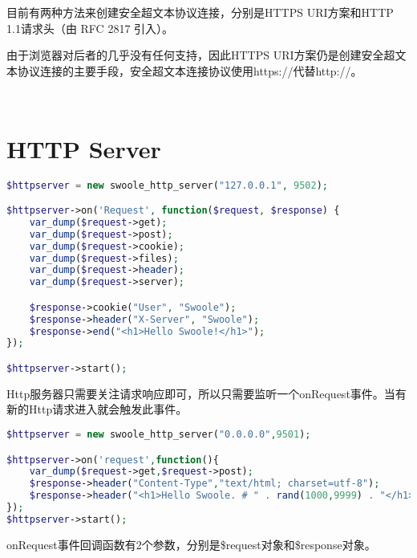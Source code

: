 目前有两种方法来创建安全超文本协议连接，分别是HTTPS URI方案和HTTP 1.1请求头（由 RFC 2817 引入）。

由于浏览器对后者的几乎没有任何支持，因此HTTPS URI方案仍是创建安全超文本协议连接的主要手段，安全超文本连接协议使用https://代替http://。




\begin{lstlisting}[language=PHP]

\end{lstlisting}




\begin{lstlisting}[language=PHP]

\end{lstlisting}


\section{HTTP Server}


\begin{lstlisting}[language=PHP]
$httpserver = new swoole_http_server("127.0.0.1", 9502);

$httpserver->on('Request', function($request, $response) {
    var_dump($request->get);
    var_dump($request->post);
    var_dump($request->cookie);
    var_dump($request->files);
    var_dump($request->header);
    var_dump($request->server);

    $response->cookie("User", "Swoole");
    $response->header("X-Server", "Swoole");
    $response->end("<h1>Hello Swoole!</h1>");
});

$httpserver->start();
\end{lstlisting}

Http服务器只需要关注请求响应即可，所以只需要监听一个onRequest事件。当有新的Http请求进入就会触发此事件。


\begin{lstlisting}[language=PHP]
$httpserver = new swoole_http_server("0.0.0.0",9501);

$httpserver->on('request',function(){
	var_dump($request->get,$request->post);
	$response->header("Content-Type","text/html; charset=utf-8");
	$response->header("<h1>Hello Swoole. # " . rand(1000,9999) . "</h1>");
});
$httpserver->start();
\end{lstlisting}



onRequest事件回调函数有2个参数，分别是\$request对象和\$response对象。


